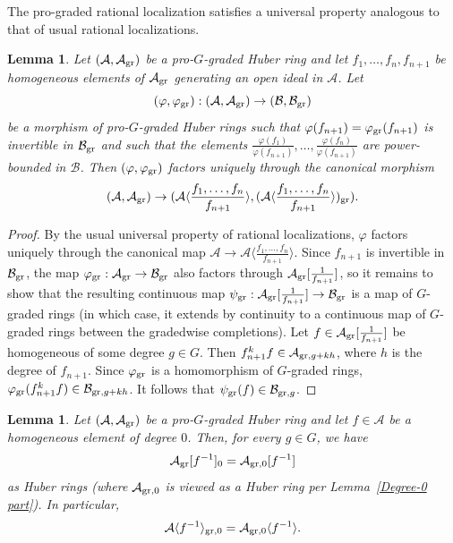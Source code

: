 \documentclass[12pt,twoside,a4paper]{article}
\newtheorem{lemma}[thm]{Lemma}
\theoremstyle{definition}
\theoremstyle{remark}
\newcommand\gr{{\rm gr}}
\begin{document}
The pro-graded rational localization satisfies a universal property analogous to that of usual rational localizations. 
\begin{lemma}\label{Universal property of pro-graded rational localization}Let $(\mathcal{A}, \mathcal{A}_{\gr})$ be a pro-$G$-graded Huber ring and let $f_{1}, \dots, f_{n}, f_{n+1}$ be homogeneous elements of $\mathcal{A}_{\gr}$ generating an open ideal in $\mathcal{A}$. Let \begin{equation*}(\varphi, \varphi_{\gr}): (\mathcal{A}, \mathcal{A}_{\gr})\to (\mathcal{B}, \mathcal{B}_{\gr})\end{equation*}be a morphism of pro-$G$-graded Huber rings such that $\varphi(f_{n+1})=\varphi_{\gr}(f_{n+1})$ is invertible in $\mathcal{B}_{\gr}$ and such that the elements $\frac{\varphi(f_{1})}{\varphi(f_{n+1})},\dots, \frac{\varphi(f_{n})}{\varphi(f_{n+1})}$ are power-bounded in $\mathcal{B}$. Then $(\varphi, \varphi_{\gr})$ factors uniquely through the canonical morphism \begin{equation*}(\mathcal{A}, \mathcal{A}_{\gr})\to (\mathcal{A}\langle \frac{f_1,\dots, f_n}{f_{n+1}}\rangle, (\mathcal{A}\langle \frac{f_1,\dots, f_n}{f_{n+1}}\rangle)_{\gr}).\end{equation*}\end{lemma}
\begin{proof}By the usual universal property of rational localizations, $\varphi$ factors uniquely through the canonical map $\mathcal{A}\to \mathcal{A}\langle \frac{f_1,\dots, f_n}{f_{n+1}}\rangle$. Since $f_{n+1}$ is invertible in $\mathcal{B}_{\gr}$, the map $\varphi_{\gr}: \mathcal{A}_{\gr}\to \mathcal{B}_{\gr}$ also factors through $\mathcal{A}_{\gr}[\frac{1}{f_{n+1}}]$, so it remains to show that the resulting continuous map $\psi_{\gr}: \mathcal{A}_{\gr}[\frac{1}{f_{n+1}}]\to \mathcal{B}_{\gr}$ is a map of $G$-graded rings (in which case, it extends by continuity to a continuous map of $G$-graded rings between the gradedwise completions). Let $f\in \mathcal{A}_{\gr}[\frac{1}{f_{n+1}}]$ be homogeneous of some degree $g\in G$. Then $f_{n+1}^{k}f\in \mathcal{A}_{\gr, g+kh}$, where $h$ is the degree of $f_{n+1}$. Since $\varphi_{\gr}$ is a homomorphism of $G$-graded rings, $\varphi_{\gr}(f_{n+1}^{k}f)\in \mathcal{B}_{\gr, g+kh}$. It follows that $\psi_{\gr}(f)\in\mathcal{B}_{\gr, g}$. \end{proof}
\begin{lemma}\label{Pro-graded rational localizations, special case}Let $(\mathcal{A}, \mathcal{A}_{\gr})$ be a pro-$G$-graded Huber ring and let $f\in \mathcal{A}$ be a homogeneous element of degree $0$. Then, for every $g\in G$, we have \begin{equation*}\mathcal{A}_{\gr}[f^{-1}]_{0}=\mathcal{A}_{\gr,0}[f^{-1}]\end{equation*}as Huber rings (where $\mathcal{A}_{\gr,0}$ is viewed as a Huber ring per Lemma~\ref{Degree-0 part}). In particular, \begin{equation*}\mathcal{A}\langle f^{-1}\rangle_{\gr,0}=\mathcal{A}_{\gr,0}\langle f^{-1}\rangle.\end{equation*}\end{lemma}
\end{document}
